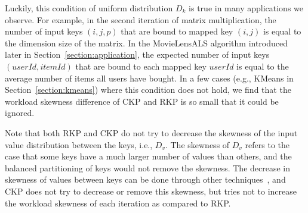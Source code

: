 \documentclass[10pt,journal,compsoc]{IEEEtran}
\begin{document}

Luckily, this condition of uniform distribution $D_k$ is true in many applications we observe.
For example, in the second iteration of matrix multiplication, 
the number of input keys $(i,j,p)$ that
are bound to mapped key $(i,j)$ is equal to the dimension size of the matrix.
In the MovieLensALS algorithm introduced later in Section~\ref{section:application}, the expected number of input keys $(userId, itemId)$
that are bound to each mapped key $userId$ is equal to the average number of
items all users have bought.
In a few cases (e.g., KMeans in Section~\ref{section:kmeans}) where
this condition does not hold,
we find that the workload skewness difference of CKP and RKP is so small
that it could be ignored.%


Note that both RKP and CKP do not try to decrease the skewness of the input
value distribution between the keys, i.e., $D_v$. The skewness of $D_v$
refers to the case that some keys have a much larger number of values than
others, and the balanced partitioning of keys would not remove the
skewness. The decrease in skewness of values between keys can be done
through other techniques~\cite{kwon2010skew, kwon2012skewtune}, and CKP does
not try to decrease or remove this skewness, but tries not to increase
the workload skewness of each iteration as compared to RKP.


\end{document}
